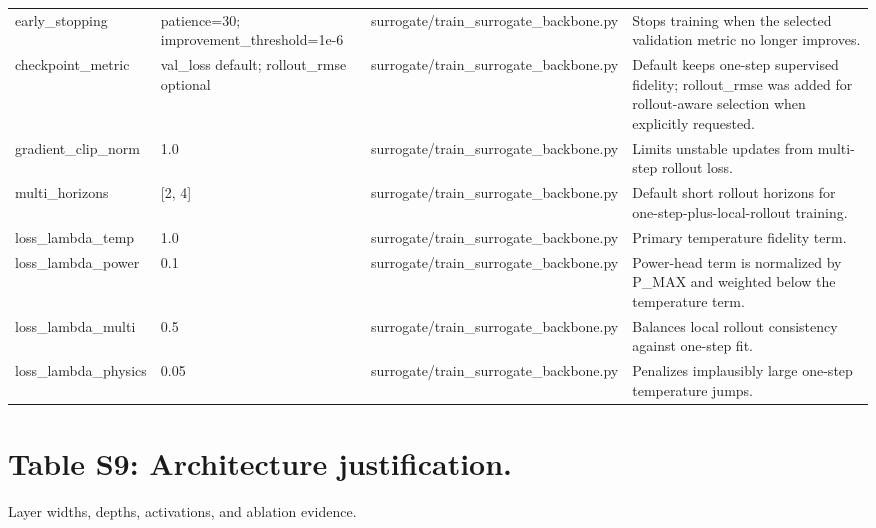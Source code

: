 \documentclass[11pt,a4paper]{article}
\begin{document}
\begin{small}
\begin{longtable}{L{4.12cm} L{4.12cm} L{4.12cm} L{4.12cm}}
early\_stopping & patience=30; improvement\_threshold=1e-6 & surrogate/train\_surrogate\_backbone.py & Stops training when the selected validation metric no longer improves. \\
checkpoint\_metric & val\_loss default; rollout\_rmse optional & surrogate/train\_surrogate\_backbone.py & Default keeps one-step supervised fidelity; rollout\_rmse was added for rollout-aware selection when explicitly requested. \\
gradient\_clip\_norm & 1.0 & surrogate/train\_surrogate\_backbone.py & Limits unstable updates from multi-step rollout loss. \\
multi\_horizons & [2, 4] & surrogate/train\_surrogate\_backbone.py & Default short rollout horizons for one-step-plus-local-rollout training. \\
loss\_lambda\_temp & 1.0 & surrogate/train\_surrogate\_backbone.py & Primary temperature fidelity term. \\
loss\_lambda\_power & 0.1 & surrogate/train\_surrogate\_backbone.py & Power-head term is normalized by P\_MAX and weighted below the temperature term. \\
loss\_lambda\_multi & 0.5 & surrogate/train\_surrogate\_backbone.py & Balances local rollout consistency against one-step fit. \\
loss\_lambda\_physics & 0.05 & surrogate/train\_surrogate\_backbone.py & Penalizes implausibly large one-step temperature jumps. \\
\end{longtable}
\end{small}

\section*{Table S9:  Architecture justification.}
Layer widths, depths, activations, and ablation evidence.
\end{document}
